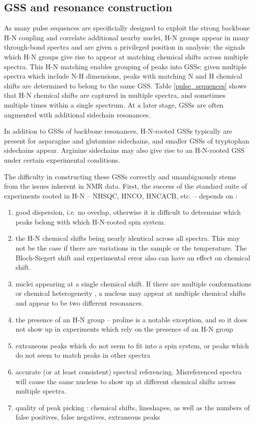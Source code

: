 \subsection*{GSS and resonance construction}
As many pulse sequences are specificially designed to exploit the strong
backbone H-N coupling and correlate additional nearby nuclei, H-N groups appear 
in many through-bond spectra and are given a privileged position in analysis: 
the signals which H-N groups give rise to appear at matching chemical shifts
across multiple spectra.
This H-N matching enables grouping of peaks into GSSs; given multiple spectra
which include N-H dimensions, peaks with matching N and H chemical shifts are
determined to belong to the same GSS.
Table \ref{pulse_sequences} shows that H-N chemical shifts are captured in 
multiple spectra, and sometimes multiple times within a single spectrum.
At a later stage, GSSs are often augmented with additional sidechain resonances.
	
In addition to GSSs of backbone resonances, H-N-rooted GSSs typically are 
present for asparagine and glutamine sidechains, and smaller GSSs of 
tryptophan sidechains appear.  Arginine sidechains may also give rise 
to an H-N-rooted GSS under certain experimental conditions. 

The difficulty in constructing these GSSs correctly and unambiguously stems 
from the issues inherent in NMR data.  First, the success of the standard 
suite of experiments rooted in H-N -- NHSQC, HNCO, HNCACB, etc. -- depends 
on \cite{autoassign1997}: %
\begin{enumerate}
  \item good dispersion, i.e. no overlap, otherwise it is difficult to determine 
    which peaks belong with which H-N-rooted spin system.
  \item the H-N chemical shifts being nearly identical across all spectra.  
    This may not be the case if there are variations in the sample or the 
    temperature.  The Bloch-Siegert shift and experimental error also can have 
    an effect on chemical shift.
  \item nuclei appearing at a single chemical shift.  If there are multiple 
    conformations or chemical heterogeneity \cite{autoassign1997}, 
    a nucleus may appear at multiple chemical shifts and appear to be two 
    different resonances.
  \item the presence of an H-N group -- proline is a notable exception, and 
    so it does not show up in experiments which rely on the presence of an H-N group
  \item extraneous peaks which do not seem to fit into a spin system, or 
    peaks which do not seem to match peaks in other spectra
  \item accurate (or at least consistent) spectral referencing.  
    Misreferenced spectra will cause the same nucleus to show up at different 
    chemical shifts across multiple spectra.
  \item quality of peak picking \cite{autoassign1997, mars}: 
    chemical shifts, lineshapes, as well as the numbers of 
    false positives, false negatives, extraneous peaks
\end{enumerate}

